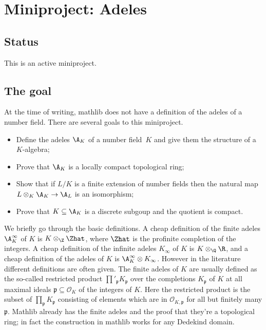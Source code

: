 \chapter{Miniproject: Adeles}\label{Adele_miniproject}

\section{Status}

This is an active miniproject.

\section{The goal}

At the time of writing, mathlib does not have a definition of the adeles of
a number field. There are several goals to this miniproject.

\begin{itemize}
  \item Define the adeles $\A_K$ of a number field~$K$ and
  give them the structure of a $K$-algebra;
  \item Prove that $\A_K$ is a locally compact topological ring;
  \item Show that if $L/K$ is a finite extension of number fields then the
    natural map $L\otimes_K\A_K\to\A_L$ is an isomorphism;
  \item Prove that $K \subseteq \A_K$ is a discrete subgoup and the quotient is compact.
\end{itemize}

We briefly go through the basic definitions. A cheap definition of the finite
adeles $\A_K^\infty$ of $K$ is $K\otimes_{\Z}\Zhat$, where $\Zhat$ is
the profinite completion of the integers. A cheap definition of the infinite adeles
$K_\infty$ of $K$ is $K\otimes_{\Q}\R$, and a cheap definition of the adeles
of $K$ is $\A_K^\infty\otimes K_\infty$. However in the literature different definitions
are often given. The finite adeles of $K$ are usually defined
as the so-called restricted product $\prod'_{\mathfrak{p}}K_{\mathfrak{p}}$ over the completions
$K_{\mathfrak{p}}$ of $K$ at all maximal ideals $\mathfrak{p}\subseteq\mathcal{O}_K$ of the
integers of $K$. Here the restricted product is the subset of $\prod_{\mathfrak{p}}K_{\mathfrak{p}}$
consisting of elements which are in $\mathcal{O}_{K,\mathfrak{p}}$ for all but finitely many
$\mathfrak{p}$.
Mathlib already has the finite adeles and the proof that they're a topological ring;
in fact the construction in mathlib works for any Dedekind domain.

